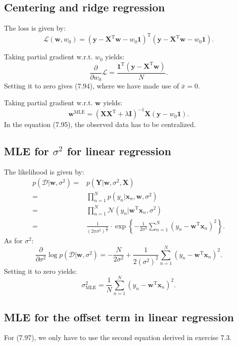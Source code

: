 \documentclass[UTF8]{ctexart}
\begin{document}
\subsection{Centering and ridge regression}
The loss is given by:
$$\mathcal{L}(\textbf{w},w_{0})=\left(\textbf{y}-\textbf{X}^{\text{T}}\textbf{w}-w_{0}\textbf{1}\right)^{\text{T}}\left(\textbf{y}-\textbf{X}^{\text{T}}\textbf{w}-w_{0}\textbf{1}\right).$$

Taking partial gradient w.r.t. $w_{0}$ yields:
$$\frac{\partial}{\partial w_{0}} \mathcal{L}=\frac{\textbf{1}^{\text{T}}(\textbf{y}-\textbf{X}^{\text{T}}\textbf{w})}{N}.$$
Setting it to zero gives (7.94), where we have made use of $\bar{x}=0$.

Taking partial gradient w.r.t. $\textbf{w}$ yields:
$$\textbf{w}^{\text{MLE}}=(\textbf{X}\textbf{X}^{\text{T}}+\lambda \textbf{I})^{-1}\textbf{X}(\textbf{y}-w_{0}\textbf{1}).$$
In the equation (7.95), the observed data has to be centralized.

\subsection{MLE for $\sigma^{2}$ for linear regression}
The likelihood is given by:
\begin{align}
p(\mathcal{D}|\textbf{w},\sigma^{2})=&p(\textbf{Y}|\textbf{w},\sigma^{2},\textbf{X})\nonumber \\
=&\prod_{n=1}^{N}p(y_{n}|\textbf{x}_{n},\textbf{w},\sigma^{2})\nonumber \\
=&\prod_{n=1}^{N}\mathcal{N}(y_{n}|\textbf{w}^{\text{T}}\textbf{x}_{n},\sigma^{2})\nonumber \\
=&\frac{1}{(2\pi\sigma^{2})^{\frac{N}{2}}}\cdot\exp\left\{ -\frac{1}{2\sigma^{2}}\sum_{n=1}^{N}(y_{n}-\textbf{w}^{\text{T}}\textbf{x}_{n})^{2} \right\}.\nonumber
\end{align}
As for $\sigma^{2}$:
$$\frac{\partial}{\partial \sigma^{2}}\log p(\mathcal{D}|\textbf{w},\sigma^{2}) = -\frac{N}{2\sigma^{2}}+\frac{1}{2(\sigma^{2})^{2}}\sum_{n=1}^{N}(y_{n}-\textbf{w}^{\text{T}}\textbf{x}_{n})^{2}.$$
Setting it to zero yields:
$$\sigma^{2}_{\text{MLE}}=\frac{1}{N}\sum_{n=1}^{N}(y_{n}-\textbf{w}^{\text{T}}\textbf{x}_{n})^{2}.$$

\subsection{MLE for the offset term in linear regression}
For (7.97), we only have to use the second equation derived in exercise 7.3.
\end{document}
